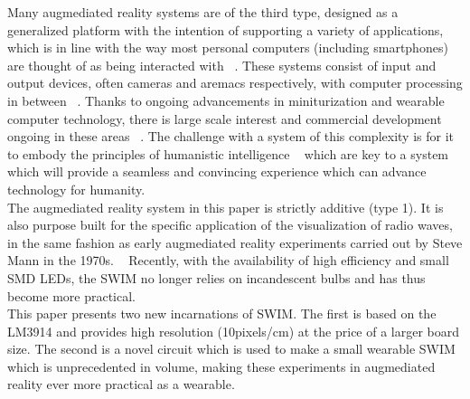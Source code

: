 \documentclass[conference]{sig-alternate-05-2015}
\begin{document}
Many augmediated reality systems are of the third type, designed as a generalized platform with the intention of supporting a variety of applications, which is in line with the way most personal computers (including smartphones) are thought of as being interacted with ~\cite{arsurvey}. These systems consist of input and output devices, often cameras and aremacs respectively, with computer processing in between ~\cite{mann2012realtime}. Thanks to ongoing advancements in miniturization and wearable computer technology, there is large scale interest and commercial development ongoing in these areas ~\cite{mann1998wearable}. The challenge with a system of this complexity is for it to embody the principles of humanistic intelligence ~\cite{mann1998humanistic} which are key to a system which will provide a seamless and convincing experience which can advance technology for humanity.~\cite{mann2001wearable}\\
The augmediated reality system in this paper is strictly additive (type 1). It is also purpose built for the specific application of the visualization of radio waves, in the same fashion as early augmediated reality experiments carried out by Steve Mann in the 1970s. ~\cite{mann2015phenomenal} Recently, with the availability of high efficiency and small SMD LEDs, the SWIM no longer relies on incandescent bulbs and has thus become more practical. \\
This paper presents two new incarnations of SWIM. The first is based on the LM3914 and provides high resolution (10pixels/cm) at the price of a larger board size. The second is a novel circuit which is used to make a small wearable SWIM which is unprecedented in volume, making these experiments in augmediated reality ever more practical as a wearable.\\
\end{document}
